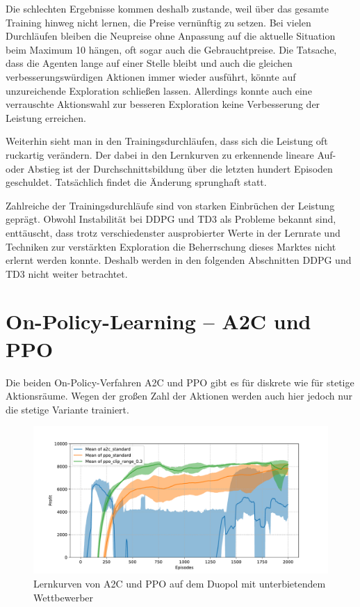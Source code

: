 Die schlechten Ergebnisse kommen deshalb zustande, weil über das gesamte Training hinweg nicht lernen, die Preise vernünftig zu setzen.
Bei vielen Durchläufen bleiben die Neupreise ohne Anpassung auf die aktuelle Situation beim Maximum 10 hängen, oft sogar auch die Gebrauchtpreise.
Die Tatsache, dass die Agenten lange auf einer Stelle bleibt und auch die gleichen verbesserungswürdigen Aktionen immer wieder ausführt, könnte auf unzureichende Exploration schließen lassen.
Allerdings konnte auch eine verrauschte Aktionswahl zur besseren Exploration keine Verbesserung der Leistung erreichen.

Weiterhin sieht man in den Trainingsdurchläufen, dass sich die Leistung oft ruckartig verändern.
Der dabei in den Lernkurven zu erkennende lineare Auf- oder Abstieg ist der Durchschnittsbildung über die letzten hundert Episoden geschuldet.
Tatsächlich findet die Änderung sprunghaft statt.

Zahlreiche der Trainingsdurchläufe sind von starken Einbrüchen der Leistung geprägt.
Obwohl Instabilität bei DDPG und TD3 als Probleme bekannt sind, enttäuscht, dass trotz verschiedenster ausprobierter Werte in der Lernrate und Techniken zur verstärkten Exploration die Beherrschung dieses Marktes nicht erlernt werden konnte.
Deshalb werden in den folgenden Abschnitten DDPG und TD3 nicht weiter betrachtet.

\section{On-Policy-Learning -- A2C und PPO}
\label{section:main_ppo}
Die beiden On-Policy-Verfahren A2C und PPO gibt es für diskrete wie für stetige Aktionsräume.
Wegen der großen Zahl der Aktionen werden auch hier jedoch nur die stetige Variante trainiert.

\begin{figure}[htbp]
	\centering
	\includegraphics[width=\textwidth]{main/a2c_vs_ppo.pdf}
	\caption{Lernkurven von A2C und PPO auf dem Duopol mit unterbietendem Wettbewerber}
	\label{graphic:OnPolicyLearningCurves}
\end{figure}

